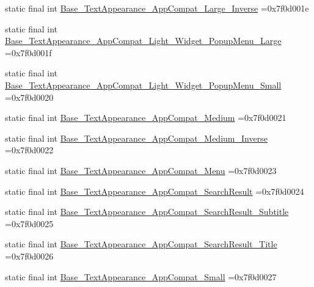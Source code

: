 \begin{DoxyCompactItemize}
\item 
static final int \mbox{\hyperlink{classbr_1_1unb_1_1cic_1_1mp_1_1marketmaster_1_1R_1_1style_a6a53aa850d48230f6ff36bb03e3325e0}{Base\+\_\+\+Text\+Appearance\+\_\+\+App\+Compat\+\_\+\+Large\+\_\+\+Inverse}} =0x7f0d001e
\item 
static final int \mbox{\hyperlink{classbr_1_1unb_1_1cic_1_1mp_1_1marketmaster_1_1R_1_1style_a375c66bb70fcdc5b4183ef2814237d55}{Base\+\_\+\+Text\+Appearance\+\_\+\+App\+Compat\+\_\+\+Light\+\_\+\+Widget\+\_\+\+Popup\+Menu\+\_\+\+Large}} =0x7f0d001f
\item 
static final int \mbox{\hyperlink{classbr_1_1unb_1_1cic_1_1mp_1_1marketmaster_1_1R_1_1style_a4078f7df3b8f5a09bc4d5d927ffd1fd0}{Base\+\_\+\+Text\+Appearance\+\_\+\+App\+Compat\+\_\+\+Light\+\_\+\+Widget\+\_\+\+Popup\+Menu\+\_\+\+Small}} =0x7f0d0020
\item 
static final int \mbox{\hyperlink{classbr_1_1unb_1_1cic_1_1mp_1_1marketmaster_1_1R_1_1style_a38604cb7acaea349e33dba8bd26c2582}{Base\+\_\+\+Text\+Appearance\+\_\+\+App\+Compat\+\_\+\+Medium}} =0x7f0d0021
\item 
static final int \mbox{\hyperlink{classbr_1_1unb_1_1cic_1_1mp_1_1marketmaster_1_1R_1_1style_ad205ed9158d981ea0cf75707995b7bc4}{Base\+\_\+\+Text\+Appearance\+\_\+\+App\+Compat\+\_\+\+Medium\+\_\+\+Inverse}} =0x7f0d0022
\item 
static final int \mbox{\hyperlink{classbr_1_1unb_1_1cic_1_1mp_1_1marketmaster_1_1R_1_1style_a12b99aac439b67a0d8a68a743a817938}{Base\+\_\+\+Text\+Appearance\+\_\+\+App\+Compat\+\_\+\+Menu}} =0x7f0d0023
\item 
static final int \mbox{\hyperlink{classbr_1_1unb_1_1cic_1_1mp_1_1marketmaster_1_1R_1_1style_ac4c6dfa2fdace343b75ffdbaed5fc643}{Base\+\_\+\+Text\+Appearance\+\_\+\+App\+Compat\+\_\+\+Search\+Result}} =0x7f0d0024
\item 
static final int \mbox{\hyperlink{classbr_1_1unb_1_1cic_1_1mp_1_1marketmaster_1_1R_1_1style_ae527f8232aec5fdd677f4e1b88c02db6}{Base\+\_\+\+Text\+Appearance\+\_\+\+App\+Compat\+\_\+\+Search\+Result\+\_\+\+Subtitle}} =0x7f0d0025
\item 
static final int \mbox{\hyperlink{classbr_1_1unb_1_1cic_1_1mp_1_1marketmaster_1_1R_1_1style_a042cdf03084fe0603f82a9d19df9d8de}{Base\+\_\+\+Text\+Appearance\+\_\+\+App\+Compat\+\_\+\+Search\+Result\+\_\+\+Title}} =0x7f0d0026
\item 
static final int \mbox{\hyperlink{classbr_1_1unb_1_1cic_1_1mp_1_1marketmaster_1_1R_1_1style_a311f601c571d93c88b0117f1332ffd2a}{Base\+\_\+\+Text\+Appearance\+\_\+\+App\+Compat\+\_\+\+Small}} =0x7f0d0027

\end{DoxyCompactItemize}
